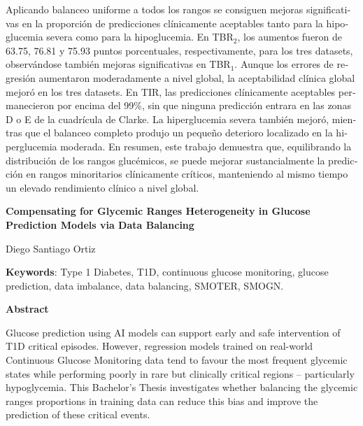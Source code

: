 \begin{otherlanguage}{spanish}
Aplicando balanceo uniforme a todos los rangos se consiguen mejoras significativas en la proporción de predicciones clínicamente aceptables tanto para la hipoglucemia severa como para la hipoglucemia. En TBR$_2$, los aumentos fueron de 63.75, 76.81 y 75.93 puntos porcentuales, respectivamente, para los tres datasets, observándose también mejoras significativas en TBR$_1$. Aunque los errores de regresión aumentaron moderadamente a nivel global, la aceptabilidad clínica global mejoró en los tres datasets. En TIR, las predicciones clínicamente aceptables permanecieron por encima del 99\%, sin que ninguna predicción entrara en las zonas D o E de la cuadrícula de Clarke. La hiperglucemia severa también mejoró, mientras que el balanceo completo produjo un pequeño deterioro localizado en la hiperglucemia moderada. En resumen, este trabajo demuestra que, equilibrando la distribución de los rangos glucémicos, se puede mejorar sustancialmente la predicción en rangos minoritarios clínicamente críticos, manteniendo al mismo tiempo un elevado rendimiento clínico a nivel global.

\end{otherlanguage}

\cleardoublepage
\thispagestyle{empty}

\begin{center}
    {\large\bfseries
    Compensating for Glycemic Ranges Heterogeneity in Glucose Prediction
    Models via Data Balancing
    \par}

    \vspace{0.5cm}

    Diego Santiago Ortiz
\end{center}

\vspace{0.7cm}

\noindent
\textbf{Keywords}: Type 1 Diabetes, T1D, continuous glucose monitoring,
glucose prediction, data imbalance, data balancing, SMOTER, SMOGN.

\vspace{0.7cm}

\noindent
\textbf{Abstract}

\vspace{0.3cm}

Glucose prediction using AI models can support early and safe intervention of T1D critical episodes. However, regression models trained on real-world Continuous Glucose Monitoring data tend to favour the most frequent glycemic states while performing poorly in rare but clinically critical regions -- particularly hypoglycemia. This Bachelor’s Thesis investigates whether balancing the glycemic ranges proportions in training data can reduce this bias and improve the prediction of these critical events.

